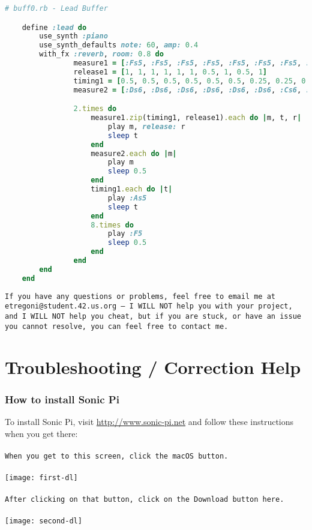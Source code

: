 \documentclass{42-en}
\begin{document}
	\begin{lstlisting}[language=Ruby]
	# buff0.rb - Lead Buffer

	define :lead do
  		use_synth :piano
  		use_synth_defaults note: 60, amp: 0.4
  		with_fx :reverb, room: 0.8 do
    			measure1 = [:Fs5, :Fs5, :Fs5, :Fs5, :Fs5, :Fs5, :Fs5, :As5, :As5, :As5]
    			release1 = [1, 1, 1, 1, 1, 1, 0.5, 1, 0.5, 1]
    			timing1 = [0.5, 0.5, 0.5, 0.5, 0.5, 0.5, 0.25, 0.25, 0.25, 0.25]
    			measure2 = [:Ds6, :Ds6, :Ds6, :Ds6, :Ds6, :Ds6, :Cs6, :Cs6]

    			2.times do
      				measure1.zip(timing1, release1).each do |m, t, r|
        				play m, release: r
        				sleep t
      				end
      				measure2.each do |m|
        				play m
        				sleep 0.5
      				end
      				timing1.each do |t|
        				play :As5
        				sleep t
      				end
      				8.times do
        				play :F5
        				sleep 0.5
      				end
    			end
  		end
	end

	\end{lstlisting}
	\texttt{If you have any questions or problems, feel free to email me at etregoni@student.42.us.org -- I WILL NOT help you with your project, and I WILL NOT help you cheat, but if you are stuck, or have an issue you cannot resolve, you can feel free to contact me.}

\chapter{Troubleshooting / Correction Help}
	\subsection{How to install Sonic Pi}
		To install Sonic Pi, visit \url{http://www.sonic-pi.net} and follow these instructions when you get there:\\\\

		\texttt{When you get to this screen, click the macOS button.}\\\\
		\texttt{[image: first-dl]}\\\\

		\texttt{After clicking on that button, click on the Download button here.}\\\\
		\texttt{[image: second-dl]}\\\\
\end{document}
